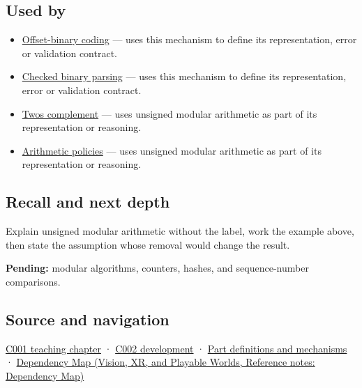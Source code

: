 \subsection{Used by}\label{appendix-c99977d88b33-used-by}

\hypertarget{appendix-c99977d88b33-used-by}{}

\begin{itemize}
\item
  \hyperref[appendix-53a8cfb25f8d]{Offset-binary coding} --- uses this mechanism to define its representation, error or validation contract.
\item
  \hyperref[appendix-652d81568de9]{Checked binary parsing} --- uses this mechanism to define its representation, error or validation contract.
\item
  \hyperref[appendix-4fbc03d20829]{Two\textquotesingle s complement} --- uses unsigned modular arithmetic as part of its representation or reasoning.
\item
  \hyperref[appendix-2ed044358b82]{Arithmetic policies} --- uses unsigned modular arithmetic as part of its representation or reasoning.
\end{itemize}

\subsection{Recall and next depth}\label{appendix-c99977d88b33-recall-and-next-depth}

\hypertarget{appendix-c99977d88b33-recall-and-next-depth}{}

Explain unsigned modular arithmetic without the label, work the example above, then state the assumption whose removal would change the result.

\textbf{Pending:} modular algorithms, counters, hashes, and sequence-number comparisons.

\subsection{Source and navigation}\label{appendix-c99977d88b33-source-and-navigation}

\hypertarget{appendix-c99977d88b33-source-and-navigation}{}

\hyperref[01-foundations-i-ch001-from-a-signal-to-an-interpretation]{C001 teaching chapter} · \hyperref[01-foundations-i-ch001-arithmetic-becomes-a-policy]{C002 development} · \hyperref[appendix-fd090d982a15]{Part definitions and mechanisms} · \href{../07-Vision-XR-and-Playable-Worlds/main.pdf\#nameddest=appendix-4ad47bdd269a}{Dependency Map (Vision, XR, and Playable Worlds, Reference notes: Dependency Map)}
